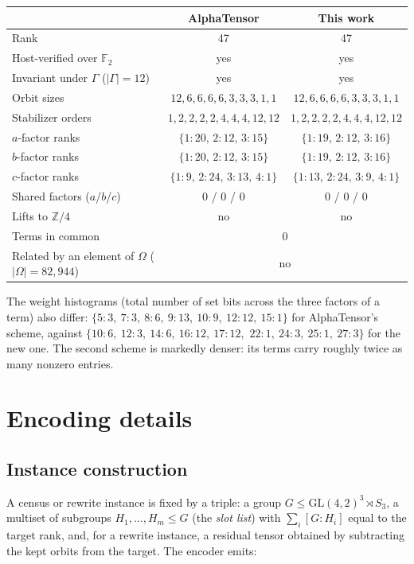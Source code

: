\documentclass[11pt]{article}
\newcommand{\FF}{\mathbb{F}_2}
\newcommand{\GL}{\mathrm{GL}}
\begin{document}
\begin{center}
\begin{tabular}{lcc}
\toprule
 & AlphaTensor & This work \\
\midrule
Rank & 47 & 47 \\
Host-verified over $\FF$ & yes & yes \\
Invariant under $\Gamma$ ($|\Gamma| = 12$) & yes & yes \\
Orbit sizes & $12,6,6,6,6,3,3,3,1,1$ & $12,6,6,6,6,3,3,3,1,1$ \\
Stabilizer orders & $1,2,2,2,2,4,4,4,12,12$ & $1,2,2,2,2,4,4,4,12,12$ \\
$a$-factor ranks & $\{1{:}20,\,2{:}12,\,3{:}15\}$ & $\{1{:}19,\,2{:}12,\,3{:}16\}$ \\
$b$-factor ranks & $\{1{:}20,\,2{:}12,\,3{:}15\}$ & $\{1{:}19,\,2{:}12,\,3{:}16\}$ \\
$c$-factor ranks & $\{1{:}9,\,2{:}24,\,3{:}13,\,4{:}1\}$ & $\{1{:}13,\,2{:}24,\,3{:}9,\,4{:}1\}$ \\
Shared factors ($a$/$b$/$c$) & 0 / 0 / 0 & 0 / 0 / 0 \\
Lifts to $\mathbb{Z}/4$ & no & no \\
Terms in common & \multicolumn{2}{c}{0} \\
Related by an element of $\Omega$ ($|\Omega| = 82{,}944$) & \multicolumn{2}{c}{no} \\
\bottomrule
\end{tabular}
\end{center}

The weight histograms (total number of set bits across the three factors of a term) also differ:
$\{5{:}3,\ 7{:}3,\ 8{:}6,\ 9{:}13,\ 10{:}9,\ 12{:}12,\ 15{:}1\}$ for AlphaTensor's scheme, against
$\{10{:}6,\ 12{:}3,\ 14{:}6,\ 16{:}12,\ 17{:}12,$ $22{:}1,\ 24{:}3,\ 25{:}1,\ 27{:}3\}$ for the new one.
The second scheme is markedly denser: its terms carry roughly twice as many nonzero entries.

\section{Encoding details}

\subsection{Instance construction}

A census or rewrite instance is fixed by a triple: a group $G \leq \GL(4,2)^3 \rtimes S_3$, a multiset of
subgroups $H_1,\dots,H_m \leq G$ (the \emph{slot list}) with $\sum_i [G:H_i]$ equal to the target rank,
and, for a rewrite instance, a residual tensor obtained by subtracting the kept orbits from the target.
The encoder emits:
\end{document}
